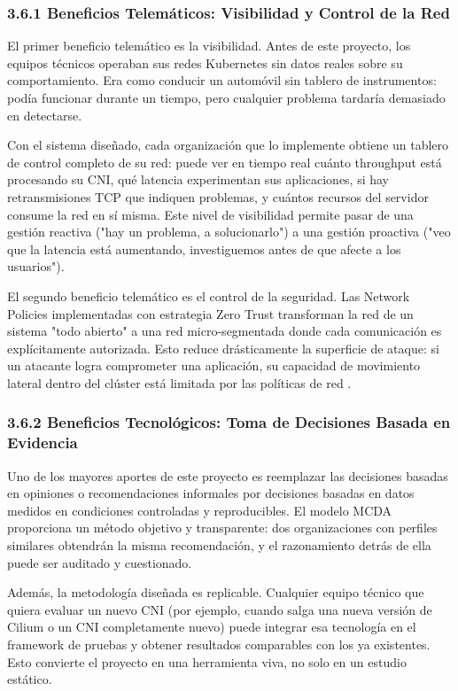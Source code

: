\documentclass[journal]{IEEEtran}
\begin{document}
\subsubsection{3.6.1 Beneficios Telemáticos: Visibilidad y Control de la Red}

El primer beneficio telemático es la visibilidad. Antes de este proyecto, los equipos técnicos operaban sus redes Kubernetes sin datos reales sobre su comportamiento. Era como conducir un automóvil sin tablero de instrumentos: podía funcionar durante un tiempo, pero cualquier problema tardaría demasiado en detectarse.

Con el sistema diseñado, cada organización que lo implemente obtiene un tablero de control completo de su red: puede ver en tiempo real cuánto throughput está procesando su CNI, qué latencia experimentan sus aplicaciones, si hay retransmisiones TCP que indiquen problemas, y cuántos recursos del servidor consume la red en sí misma. Este nivel de visibilidad permite pasar de una gestión reactiva ("hay un problema, a solucionarlo") a una gestión proactiva ("veo que la latencia está aumentando, investiguemos antes de que afecte a los usuarios").

El segundo beneficio telemático es el control de la seguridad. Las Network Policies implementadas con estrategia Zero Trust transforman la red de un sistema "todo abierto" a una red micro-segmentada donde cada comunicación es explícitamente autorizada. Esto reduce drásticamente la superficie de ataque: si un atacante logra comprometer una aplicación, su capacidad de movimiento lateral dentro del clúster está limitada por las políticas de red \cite{ref16}.

\subsubsection{3.6.2 Beneficios Tecnológicos: Toma de Decisiones Basada en Evidencia}

Uno de los mayores aportes de este proyecto es reemplazar las decisiones basadas en opiniones o recomendaciones informales por decisiones basadas en datos medidos en condiciones controladas y reproducibles. El modelo MCDA proporciona un método objetivo y transparente: dos organizaciones con perfiles similares obtendrán la misma recomendación, y el razonamiento detrás de ella puede ser auditado y cuestionado.

Además, la metodología diseñada es replicable. Cualquier equipo técnico que quiera evaluar un nuevo CNI (por ejemplo, cuando salga una nueva versión de Cilium o un CNI completamente nuevo) puede integrar esa tecnología en el framework de pruebas y obtener resultados comparables con los ya existentes. Esto convierte el proyecto en una herramienta viva, no solo en un estudio estático.
\end{document}
